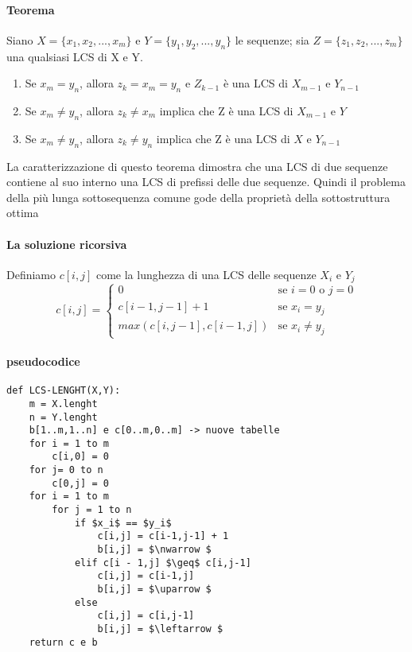 \documentclass[12pt, a4paper, openany]{book}
\begin{document}
\paragraph{Teorema}
Siano $X=\{x_1,x_2,...,x_m\}$ e $Y=\{y_1,y_2,...,y_n\}$ le sequenze; sia $Z=\{z_1,z_2,...,z_m\}$ una qualsiasi LCS di X e Y.
\begin{enumerate}
	\item Se $x_m = y_n$, allora $z_k = x_m =y_n$ e $Z_{k-1}$ è  una LCS di $X_{m-1}$ e $Y_{n-1}$
	\item Se $x_m \neq y_n$, allora $z_k \neq x_m$ implica che Z è una LCS di $X_{m-1}$ e $Y$
	\item Se $x_m \neq y_n$, allora $z_k \neq y_n$ implica che Z è una LCS di $X$ e $Y_{n-1}$
\end{enumerate}
La caratterizzazione di questo teorema dimostra che una LCS di due sequenze contiene al suo interno una LCS di prefissi delle due sequenze.
Quindi il problema della più lunga sottosequenza comune gode della proprietà della sottostruttura ottima

\paragraph{La soluzione ricorsiva}
Definiamo $c[i,j]$ come la lunghezza di una LCS delle sequenze $X_i$ e $Y_j$
\begin{equation*}
	c[i,j] = \begin{cases}
		0                       & \text{se $i = 0$ o $j = 0$} \\
		c[i-1,j-1] + 1          & \text{se $x_i = y_j$}       \\
		max(c[i,j-1], c[i-1,j]) & \text{se $x_i \neq y_j$}
	\end{cases}
\end{equation*}

\paragraph{pseudocodice}
\begin{lstlisting}
def LCS-LENGHT(X,Y):
	m = X.lenght
	n = Y.lenght
	b[1..m,1..n] e c[0..m,0..m] -> nuove tabelle
	for i = 1 to m
		c[i,0] = 0
	for j= 0 to n
		c[0,j] = 0
	for i = 1 to m
		for j = 1 to n
			if $x_i$ == $y_i$
				c[i,j] = c[i-1,j-1] + 1  
				b[i,j] = $\nwarrow $
			elif c[i - 1,j] $\geq$ c[i,j-1]
				c[i,j] = c[i-1,j]  
				b[i,j] = $\uparrow $
			else
				c[i,j] = c[i,j-1]  
				b[i,j] = $\leftarrow $
	return c e b
\end{lstlisting}
\end{document}
